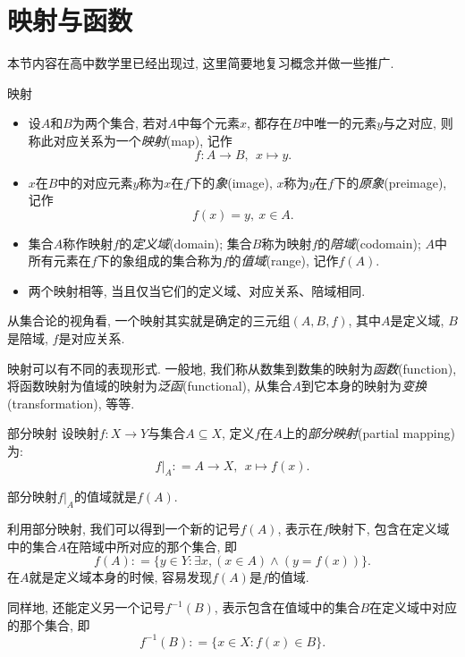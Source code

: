 \newpage
\section{映射与函数}

本节内容在高中数学里已经出现过, 这里简要地复习概念并做一些推广.

\begin{definition}{映射}
	\vspace{-2em}
	\begin{itemize}
		\item 设$A$和$B$为两个集合, 若对$A$中每个元素$x$, 都存在$B$中唯一的元素$y$与之对应, 则称此对应关系为一个\textit{映射}(map), 记作$$f: A \to B, ~~x \mapsto y.$$
		\item $x$在$B$中的对应元素$y$称为$x$在$f$下的\textit{象}(image), $x$称为$y$在$f$下的\textit{原象}(preimage), 记作$$f(x) = y, ~ x \in A.$$
		\item 集合$A$称作映射$f$的\textit{定义域}(domain); 集合$B$称为映射$f$的\textit{陪域}(codomain); $A$中所有元素在$f$下的象组成的集合称为$f$的\textit{值域}(range), 记作$f(A)$.
		\item 两个映射相等, 当且仅当它们的定义域、对应关系、陪域相同.
	\end{itemize}
\end{definition}

从集合论的视角看, 一个映射其实就是确定的三元组$(A, B, f)$, 其中$A$是定义域, $B$是陪域, $f$是对应关系.

映射可以有不同的表现形式. 一般地, 我们称从数集到数集的映射为\textit{函数}(function), 将函数映射为值域的映射为\textit{泛函}(functional), 从集合$A$到它本身的映射为\textit{变换}(transformation), 等等. 

\begin{definition}{部分映射}
	设映射$f: X \to Y$与集合$A \subseteq X$, 定义$f$在$A$上的\textit{部分映射}(partial mapping)为: $$f|_A : = A \to X, ~~x \mapsto f(x).$$
\end{definition}
\begin{remark}
	部分映射$f|_A$的值域就是$f(A)$.
\end{remark}

利用部分映射, 我们可以得到一个新的记号$f(A)$, 表示在$f$映射下, 包含在定义域中的集合$A$在陪域中所对应的那个集合, 即$$f(A) : = \{ y \in Y: \exists x,  (x \in A) \wedge (y=f(x)) \}.$$
在$A$就是定义域本身的时候, 容易发现$f(A)$是$f$的值域.

同样地, 还能定义另一个记号$f^{-1}(B)$, 表示包含在值域中的集合$B$在定义域中对应的那个集合, 即$$f^{-1}(B) : = \{ x \in X: f(x) \in B \}.$$


